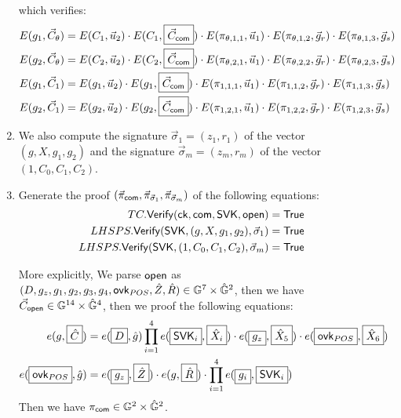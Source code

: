\begin{description}
\begin{enumerate}
    which verifies:
    \begin{align*}
      E(g_1, \vec{C}_{\theta}) &= E(C_1, \vec{u}_2) \cdot E(C_1, \boxed{\vec{C}_{\mathsf{com}}}) \cdot E(\pi_{\theta,1,1}, \vec{u}_1) \cdot E(\pi_{\theta,1,2}, \vec{g}_r) \cdot E(\pi_{\theta,1,3}, \vec{g}_s)\\
      E(g_2, \vec{C}_{\theta}) &= E(C_2, \vec{u}_2) \cdot E(C_2, \boxed{\vec{C}_{\mathsf{com}}}) \cdot E(\pi_{\theta,2,1}, \vec{u}_1) \cdot E(\pi_{\theta,2,2}, \vec{g}_r) \cdot E(\pi_{\theta,2,3}, \vec{g}_s)\\
      E(g_1, \vec{C}_{1}) &= E(g_1, \vec{u}_2) \cdot E(g_1, \boxed{\vec{C}_{\mathsf{com}}}) \cdot E(\pi_{1,1,1}, \vec{u}_1) \cdot E(\pi_{1,1,2}, \vec{g}_r) \cdot E(\pi_{1,1,3}, \vec{g}_s)\\
      E(g_2, \vec{C}_{1}) &= E(g_2, \vec{u}_2) \cdot E(g_2, \boxed{\vec{C}_{\mathsf{com}}}) \cdot E(\pi_{1,2,1}, \vec{u}_1) \cdot E(\pi_{1,2,2}, \vec{g}_r) \cdot E(\pi_{1,2,3}, \vec{g}_s)
    \end{align*}
  \item We also compute the signature $\vec{\sigma}_1 = (z_1, r_1)$ of the vector $(g, X, g_1, g_2)$ and the signature $\vec{\sigma}_m = (z_m, r_m)$ of the vector $(1, C_0, C_1, C_2)$.
  \item Generate the proof $(\vec{\pi}_{\mathsf{com}}, \vec{\pi}_{\vec{\sigma}_1}, \vec{\pi}_{\vec{\sigma}_m})$ of the following equations:
    \begin{align*}
      TC.{\mathsf{Verify}}(\mathsf{ck}, \mathsf{com}, \mathsf{SVK}, \mathsf{open}) &= \mathsf{True}\\
      LHSPS.{\mathsf{Verify}}(\mathsf{SVK}, (g, X, g_1, g_2), \vec{\sigma}_1) &= \mathsf{True}\\
      LHSPS.{\mathsf{Verify}}(\mathsf{SVK}, (1, C_0, C_1, C_2), \vec{\sigma}_m) &= \mathsf{True}\\
    \end{align*}
    
    More explicitly, We parse $\mathsf{open}$ as $(D, g_z, g_1, g_2, g_3, g_4, \mathsf{ovk}_{POS}, \hat{Z}, \hat{R}) \in \mathbb{G}^7 \times \hat{\mathbb{G}}^2$, then we have $\vec{C}_{\mathsf{open}} \in \mathbb{G}^{14} \times \hat{\mathbb{G}}^4$, then we proof the following equations:
    \begin{align*}
      e(g, \boxed{\hat{C}}) &= e(\boxed{D}, \hat{g}) \prod_{i = 1}^{4} e(\boxed{\mathsf{SVK}_i}, \boxed{\hat{X}_i}) \cdot e(\boxed{g_z}, \boxed{\hat{X}_5}) \cdot e(\boxed{\mathsf{ovk}_{POS}}, \boxed{\hat{X}_6}) \\
      e(\boxed{\mathsf{ovk}_{POS}}, \hat{g}) &= e(\boxed{g_z}, \boxed{\hat{Z}}) \cdot e(g, \boxed{\hat{R}}) \cdot \prod_{i = 1}^4 e(\boxed{g_i}, \boxed{\mathsf{SVK}_i}) 
    \end{align*}
    Then we have $\pi_{\mathsf{com}} \in \mathbb{G}^2 \times \hat{\mathbb{G}}^2$.


\end{enumerate}
\end{description}
